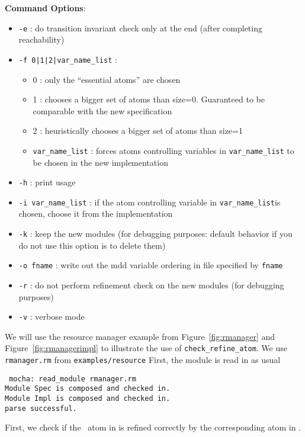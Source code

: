 \mypar
{\bf Command Options}: 
\begin {itemize}
\item
{\tt -e} : do transition invariant check only at the end (after completing
     reachability) 
\item
{\tt -f 0|1|2|var\_name\_list} :
     \begin {itemize}
     \item
     0  :  only the ``essential atoms'' are chosen 
     \item
     1  :  chooses a bigger set of atoms than size=0. Guaranteed to be
     comparable with the new specification 
     \item
     2 :  heuristically chooses a bigger set of atoms than size=1 
     \item
     {\tt var\_name\_list} :  forces atoms controlling variables in {\tt var\_name\_list} to
     be chosen in the new implementation
    \end {itemize}
\item
{\tt -h} :  print usage 
\item
{\tt -i var\_name\_list} : 
     if the atom controlling variable in {\tt var\_name\_list}is chosen, choose it
     from the implementation 
\item
{\tt -k} : keep the new modules (for debugging purposes: default behavior if you
     do not use this option is to delete them) 
\item
{\tt -o fname} :
     write out the mdd variable ordering in file specified by {\tt fname}
\item
{\tt -r} :
     do not perform refinement check on the new modules (for debugging
     purposes) 
\item
{\tt -v} :
     verbose mode 
\end {itemize}

\mypar
\noindent
We will use the resource manager example from Figure~\ref{fig:rmanager}
and Figure~\ref{fig:rmanagerimpl}
to illustrate the use of {\tt check\_refine\_atom}.
We use {\tt rmanager.rm} from  {\tt examples/resource}
First, the module is read in as usual

\mypar
\noindent
{\tt 
mocha: read\_module rmanager.rm \\
Module Spec is composed and checked in. \\
Module Impl is composed and checked in. \\
parse successful. \\
}

\mypar
\noindent
First, we check if the \ALLOC\ atom in \Rmanager is
refined correctly by the corresponding atom in \RmanagerImpl.

